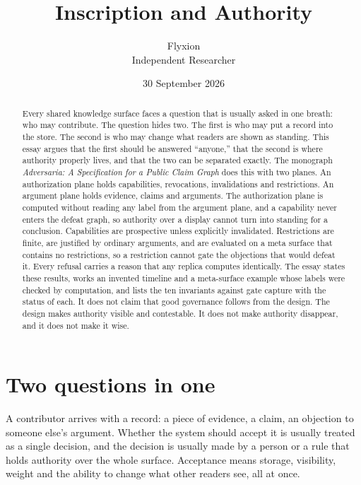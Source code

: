 \documentclass[11pt]{article}
\title{Inscription and Authority}
\author{Flyxion\\\small Independent Researcher}
\date{30 September 2026}
\begin{document}
\maketitle

\begin{abstract}
\noindent
Every shared knowledge surface faces a question that is usually asked in one breath: who may contribute. The question hides two. The first is who may put a record into the store. The second is who may change what readers are shown as standing. This essay argues that the first should be answered ``anyone,'' that the second is where authority properly lives, and that the two can be separated exactly. The monograph \emph{Adversaria: A Specification for a Public Claim Graph} does this with two planes. An authorization plane holds capabilities, revocations, invalidations and restrictions. An argument plane holds evidence, claims and arguments. The authorization plane is computed without reading any label from the argument plane, and a capability never enters the defeat graph, so authority over a display cannot turn into standing for a conclusion. Capabilities are prospective unless explicitly invalidated. Restrictions are finite, are justified by ordinary arguments, and are evaluated on a meta surface that contains no restrictions, so a restriction cannot gate the objections that would defeat it. Every refusal carries a reason that any replica computes identically. The essay states these results, works an invented timeline and a meta-surface example whose labels were checked by computation, and lists the ten invariants against gate capture with the status of each. It does not claim that good governance follows from the design. The design makes authority visible and contestable. It does not make authority disappear, and it does not make it wise.
\end{abstract}

\section{Two questions in one}

A contributor arrives with a record: a piece of evidence, a claim, an objection to someone else's argument. Whether the system should accept it is usually treated as a single decision, and the decision is usually made by a person or a rule that holds authority over the whole surface. Acceptance means storage, visibility, weight and the ability to change what other readers see, all at once.
\end{document}
